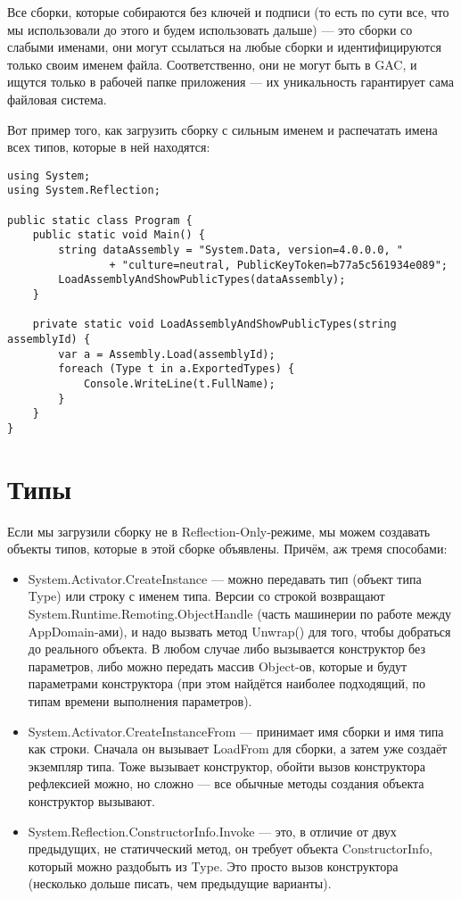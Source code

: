 \documentclass[a5paper]{article}
\begin{document}
Все сборки, которые собираются без ключей и подписи (то есть по сути все, что мы использовали до этого и будем использовать дальше) --- это сборки со слабыми именами, они могут ссылаться на любые сборки и идентифицируются только своим именем файла. Соответственно, они не могут быть в GAC, и ищутся только в рабочей папке приложения --- их уникальность гарантирует сама файловая система.

Вот пример того, как загрузить сборку с сильным именем и распечатать имена всех типов, которые в ней находятся:

\begin{verbatim}
using System;
using System.Reflection;

public static class Program {
    public static void Main() {
        string dataAssembly = "System.Data, version=4.0.0.0, "
                + "culture=neutral, PublicKeyToken=b77a5c561934e089";
        LoadAssemblyAndShowPublicTypes(dataAssembly);
    }

    private static void LoadAssemblyAndShowPublicTypes(string assemblyId) {
        var a = Assembly.Load(assemblyId);
        foreach (Type t in a.ExportedTypes) {
            Console.WriteLine(t.FullName);
        }
    }
}
\end{verbatim}

\section{Типы}

Если мы загрузили сборку не в Reflection-Only-режиме, мы можем создавать объекты типов, которые в этой сборке объявлены. Причём, аж тремя способами:

\begin{itemize}
    \item System.Activator.CreateInstance --- можно передавать тип (объект типа Type) или строку с именем типа. Версии со строкой возвращают System.Runtime.Remoting.ObjectHandle (часть машинерии по работе между AppDomain-ами), и надо вызвать метод Unwrap() для того, чтобы добраться до реального объекта. В любом случае либо вызывается конструктор без параметров, либо можно передать массив Object-ов, которые и будут параметрами конструктора (при этом найдётся наиболее подходящий, по типам времени выполнения параметров).
    \item System.Activator.CreateInstanceFrom --- принимает имя сборки и имя типа как строки. Сначала он вызывает LoadFrom для сборки, а затем уже создаёт экземпляр типа. Тоже вызывает конструктор, обойти вызов конструктора рефлексией можно, но сложно --- все обычные методы создания объекта конструктор вызывают.
    \item System.Reflection.ConstructorInfo.Invoke --- это, в отличие от двух предыдущих, не статичческий метод, он требует объекта ConstructorInfo, который можно раздобыть из Type. Это просто вызов конструктора (несколько дольше писать, чем предыдущие варианты).
\end{itemize}
\end{document}
